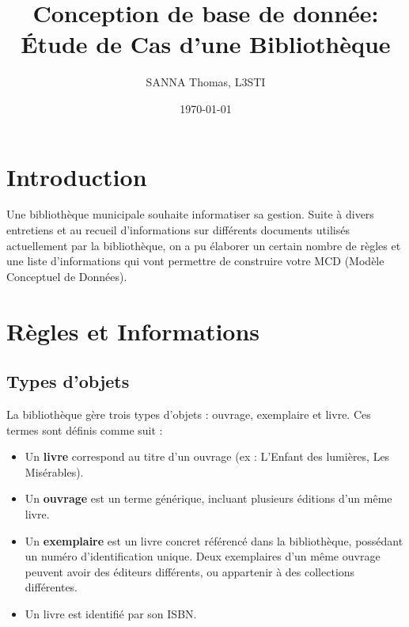 \documentclass[a4paper,11pt]{article}
\title{Conception de base de donnée: Étude de Cas d'une Bibliothèque}
\author{SANNA Thomas, L3STI}
\date{\today}
\begin{document}
\maketitle

\section{Introduction}
Une bibliothèque municipale souhaite informatiser sa gestion. Suite à divers entretiens et au recueil d'informations sur différents documents utilisés actuellement par la bibliothèque, on a pu élaborer un certain nombre de règles et une liste d'informations qui vont permettre de construire votre MCD (Modèle Conceptuel de Données).

\section{Règles et Informations}
\subsection{Types d'objets}
La bibliothèque gère trois types d’objets : ouvrage, exemplaire et livre. Ces termes sont définis comme suit :
\begin{itemize}
    \item Un \textbf{livre} correspond au titre d'un ouvrage (ex : L’Enfant des lumières, Les Misérables).
    \item Un \textbf{ouvrage} est un terme générique, incluant plusieurs éditions d’un même livre.
    \item Un \textbf{exemplaire} est un livre concret référencé dans la bibliothèque, possédant un numéro d'identification unique. Deux exemplaires d'un même ouvrage peuvent avoir des éditeurs différents, ou appartenir à des collections différentes.
    \item Un livre est identifié par son ISBN.
\end{itemize}
\end{document}
